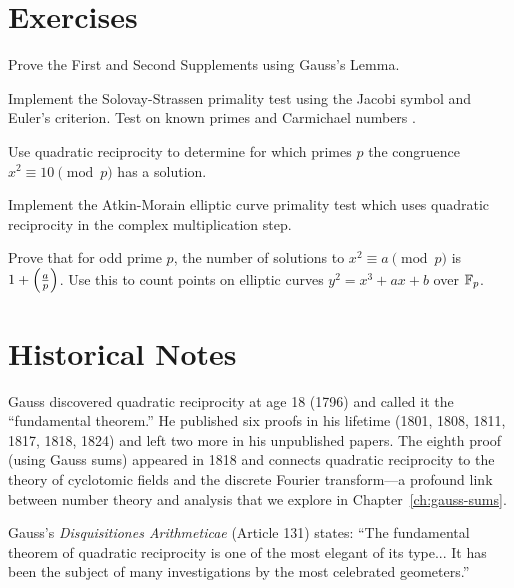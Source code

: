 \section{Exercises}

\begin{exercise}
Prove the First and Second Supplements using Gauss's Lemma.
\end{exercise}

\begin{exercise}
Implement the Solovay-Strassen primality test using the Jacobi symbol and Euler's criterion. Test on known primes and Carmichael numbers .
\end{exercise}

\begin{exercise}
Use quadratic reciprocity to determine for which primes $p$ the congruence $x^2 \equiv 10 \pmod{p}$ has a solution.
\end{exercise}

\begin{exercise}
Implement the Atkin-Morain elliptic curve primality test which uses quadratic reciprocity in the complex multiplication step.
\end{exercise}

\begin{exercise}
Prove that for odd prime $p$, the number of solutions to $x^2 \equiv a \pmod{p}$ is $1 + \left(\frac{a}{p}\right)$. Use this to count points on elliptic curves $y^2 = x^3 + ax + b$ over $\mathbb{F}_p$.
\end{exercise}

\section{Historical Notes}

Gauss discovered quadratic reciprocity at age 18 (1796) and called it the ``fundamental theorem.'' He published six proofs in his lifetime (1801, 1808, 1811, 1817, 1818, 1824) and left two more in his unpublished papers. The eighth proof (using Gauss sums) appeared in 1818 and connects quadratic reciprocity to the theory of cyclotomic fields and the discrete Fourier transform---a profound link between number theory and analysis that we explore in Chapter~\ref{ch:gauss-sums}.

Gauss's \textit{Disquisitiones Arithmeticae} (Article 131) states: ``The fundamental theorem of quadratic reciprocity is one of the most elegant of its type... It has been the subject of many investigations by the most celebrated geometers.''



